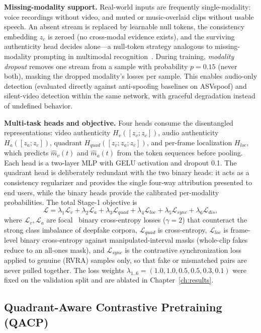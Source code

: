 \textbf{Missing-modality support.} Real-world inputs are frequently
single-modality: voice recordings without video, and muted or music-overlaid
clips without usable speech. An absent stream is replaced by learnable null
tokens, the consistency embedding $z_c$ is zeroed (no cross-modal evidence
exists), and the surviving authenticity head decides alone---a
null-token strategy analogous to missing-modality prompting in multimodal
recognition~\cite{lee2023missingmodality}. During training,
\emph{modality dropout} removes one stream from a sample with probability
$p{=}0.15$ (never both), masking the dropped modality's losses per sample.
This enables audio-only detection (evaluated directly against anti-spoofing
baselines on ASVspoof) and silent-video detection within the same network,
with graceful degradation instead of undefined behavior.

\textbf{Multi-task heads and objective.} Four heads consume the disentangled
representations: video authenticity $H_v([z_v; z_c])$, audio authenticity
$H_a([z_a; z_c])$, quadrant $H_{quad}([z_v; z_a; z_c])$, and per-frame
localization $H_{loc}$, which predicts $\hat{m}_v(t)$ and $\hat{m}_a(t)$ from
the token sequences before pooling. Each head is a two-layer MLP with GELU
activation and dropout 0.1. The quadrant head is deliberately redundant with
the two binary heads: it acts as a consistency regularizer and provides the
single four-way attribution presented to end users, while the binary heads
provide the calibrated per-modality probabilities. The total Stage-1
objective is
\begin{equation}
  \mathcal{L} = \lambda_1 \mathcal{L}_v + \lambda_2 \mathcal{L}_a
  + \lambda_3 \mathcal{L}_{quad} + \lambda_4 \mathcal{L}_{loc}
  + \lambda_5 \mathcal{L}_{sync} + \lambda_6 \mathcal{L}_{dis},
\end{equation}
where $\mathcal{L}_v, \mathcal{L}_a$ are focal~\cite{lin2017focal} binary
cross-entropy losses ($\gamma{=}2$) that counteract the strong class
imbalance of deepfake corpora, $\mathcal{L}_{quad}$ is cross-entropy,
$\mathcal{L}_{loc}$ is frame-level binary cross-entropy against
manipulated-interval masks (whole-clip fakes reduce to an all-ones mask), and
$\mathcal{L}_{sync}$ is the contrastive synchronization loss applied to genuine
(RVRA) samples only, so that fake or mismatched pairs are never pulled
together. The loss weights $\lambda_{1..6} = (1.0, 1.0, 0.5, 0.5, 0.3, 0.1)$
were fixed on the validation split and are ablated in
Chapter~\ref{ch:results}.

\subsection{Quadrant-Aware Contrastive Pretraining (QACP)}
\label{sec:qacp}


